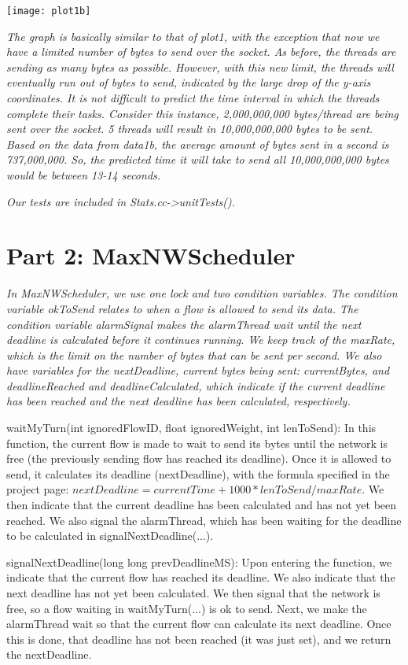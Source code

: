 \documentclass[11pt, letterpaper]{article}
\begin{document}
\centerline{\texttt{[image: plot1b]}}

{\em The graph is basically similar to that of plot1, with the exception that now we have a
limited number of bytes to send over the socket. As before, the threads are sending as many bytes
as possible. However, with this new limit, the threads will eventually run out of bytes to send,
indicated by the large drop of the y-axis coordinates. It is not difficult to predict the time
interval in which the threads complete their tasks. Consider this instance, 2,000,000,000 bytes/thread are
being sent over the socket. 5 threads will result in 10,000,000,000 bytes to be sent. Based on the data from
data1b, the average amount of bytes sent in a second is 737,000,000. So, the predicted time it will take
to send all 10,000,000,000 bytes would be between 13-14 seconds.}

{\em Our tests are included in Stats.cc->unitTests().}



\section{Part 2: MaxNWScheduler}

{\em In MaxNWScheduler, we use one lock and two condition variables. The 
condition variable okToSend relates to when a flow is allowed to send 
its data. The condition variable alarmSignal makes the alarmThread wait 
until the next deadline is calculated before it continues running. 
We keep track of the maxRate, which is the limit on the number of bytes
that can be sent per second. We also have variables for the nextDeadline, 
current bytes being sent: currentBytes, and deadlineReached and deadlineCalculated,
which indicate if the current deadline has been reached and the next deadline
has been calculated, respectively. 

waitMyTurn(int ignoredFlowID, float ignoredWeight, int lenToSend): 
In this function, the current flow is made to wait to send its bytes until the 
network is free (the previously sending flow has reached its deadline). Once it 
is allowed to send, it calculates its deadline (nextDeadline), with the formula 
specified in the project page: 
$nextDeadline = currentTime + 1000*lenToSend/maxRate$. 
We then indicate that the current deadline has been calculated and has not yet 
been reached. We also signal the alarmThread, which has been waiting for the deadline
to be calculated in signalNextDeadline(...). 

signalNextDeadline(long long prevDeadlineMS): 
Upon entering the function, we indicate that the current flow has reached its deadline. 
We also indicate that the next deadline has not yet been calculated. We then signal 
that the network is free, so a flow waiting in waitMyTurn(...) is ok to send. Next, 
we make the alarmThread wait so that the current flow can calculate its next deadline. 
Once this is done, that deadline has not been reached (it was just set), and we return 
the nextDeadline.}
\end{document}
